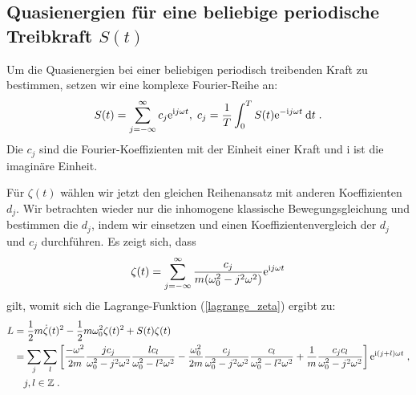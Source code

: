     \subsection{Quasienergien für eine beliebige periodische Treibkraft $S(t)$}
      \label{epsilon_bel_kraft}
      Um die Quasienergien bei einer beliebigen periodisch treibenden Kraft zu bestimmen,
      setzen wir eine komplexe Fourier-Reihe an:
      \begin{equation}
        S(t) = \sum_{j=-\infty}^\infty c_j \text e^{\text ij\omega t}, \; c_j = \frac{1}{T} \int_0^T S(t) \text e^{-\text ij\omega t} \: \text d t \; .
      \end{equation}
      Die $c_j$ sind die Fourier-Koeffizienten mit der Einheit einer Kraft und i ist die imaginäre Einheit.
\iffalse
      Für $\zeta(t)$ wählen wir jetzt ebenfalls einen Reihenansatz:
      \begin{equation}
        \zeta(t) = \sum_{j=-\infty}^\infty d_j \text e^{\text ij\omega t} \; .
      \end{equation}
\fi
      Für $\zeta(t)$ wählen wir jetzt den gleichen Reihenansatz mit anderen Koeffizienten $d_j$.
      Wir betrachten wieder nur die inhomogene klassische Bewegungsgleichung und bestimmen die $d_j$, indem wir einsetzen und einen Koeffizientenvergleich der $d_j$ und $c_j$ durchführen.
      Es zeigt sich, dass
      \begin{equation}
        \zeta(t) = \sum_{j=-\infty}^\infty \frac{c_j}{m(\omega_0^2-j^2\omega^2)} \text e^{\text ij\omega t}
        \label{zeta_bel_kraft}
      \end{equation}
      gilt, womit sich die Lagrange-Funktion (\ref{lagrange_zeta}) ergibt zu:
      \begin{align}
        \begin{split}
          L &= \frac{1}{2}m\dot \zeta(t)^2 - \frac{1}{2}m\omega_0^2\zeta(t)^2 + S(t)\zeta(t) \notag\\
           &=\sum_j \sum_l \left[ \frac{-\omega^2}{2m} \frac{jc_j}{\omega_0^2-j^2\omega^2} \frac{lc_l}{\omega_0^2-l^2\omega^2}
           -\frac{\omega_0^2}{2m} \frac{c_j}{\omega_0^2-j^2\omega^2} \frac{c_l}{\omega_0^2-l^2\omega^2} %
            + \frac{1}{m} \frac{c_jc_l}{\omega_0^2-j^2\omega^2} \right] \text e^{\text i(j+l)\omega t}  \; , \notag\\
             &\quad j,l \in \mathbb{Z} \; .
         \end{split}
       \end{align}
